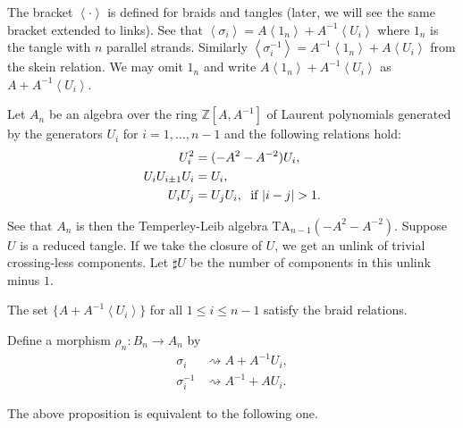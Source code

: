 The bracket $\left< \cdot \right>$ is defined for braids and tangles (later, we will see the same bracket extended to links). See that $\left< \sigma_i \right> = A\left< 1_n \right> + A^{-1}\left< U_i\right>$ where $1_n$ is the tangle with $n$ parallel strands. Similarly $\left< \sigma_i^{-1} \right> = A^{-1}\left< 1_n \right> + A\left< U_i \right>$ from the skein relation. We may omit $1_n$ and write $A\left< 1_n \right> + A^{-1}\left< U_i\right>$ as $A + A^{-1}\left< U_i\right>$.

  Let $A_n$ be an algebra over the ring $\mathbb{Z}[A, A^{-1}]$ of Laurent polynomials generated by the generators $U_i$ for $i = 1,\ldots, n-1$ and the following relations hold: 
\begin{align*}
  U_i^2 &= (-A^2-A^{-2}) U_i, \\
  U_iU_{i\pm 1}U_i &= U_i, \\
  U_iU_j &= U_jU_i, \hspace*{.6em} \text{if } |i-j|>1.
\end{align*}

See that $A_n$ is then the Temperley-Leib algebra $\text{TA}_{n-1}(-A^2-A^{-2})$. Suppose $U$ is a reduced tangle. If we take the closure of $U$, we get an unlink of trivial crossing-less components. Let $\sharp U$ be the number of components in this unlink minus $1$.

\begin{proposition}
\label{sec:temp-lieb-algebra-3}
The set $\{A + A^{-1}\left< U_i\right>\}$ for all $1 \leq i \leq n-1$ satisfy the braid relations.
\end{proposition}

Define a morphism $\rho_n : B_n \to A_n$ by 
\begin{align*}
  \sigma_i &\rightsquigarrow A + A^{-1}U_i, \\
  \sigma^{-1}_i &\rightsquigarrow A^{-1} + AU_i.
\end{align*}

The above proposition is equivalent to the following one.

